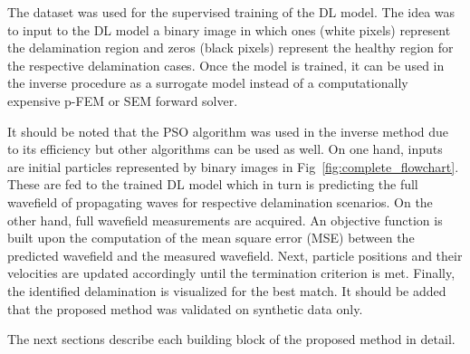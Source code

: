 The dataset was used for the supervised training of the DL model.
The idea was to input to the DL model a binary image in which ones (white pixels) represent  the delamination region and zeros (black pixels) represent the healthy region for the respective delamination cases.
Once the model is trained, it can be used in the inverse procedure as a surrogate model instead of a computationally expensive p-FEM or SEM forward solver.

It should be noted that the PSO algorithm was used in the inverse method due to its efficiency but other algorithms can be used as well. 
On one hand, inputs are initial particles represented by binary images in Fig~\ref{fig:complete_flowchart}.
These are fed to the trained DL model which in turn is predicting the full wavefield of propagating waves for respective delamination scenarios.
On the other hand, full wavefield measurements are acquired. 
An objective function is built upon the computation of the mean square error (MSE) between the predicted wavefield and the measured wavefield.
Next, particle positions and their velocities are updated accordingly until the termination criterion is met.
Finally, the identified delamination is visualized for the best match.
It should be added that the proposed method was validated on synthetic data only. 

The next sections describe each building block of the proposed method in detail.

